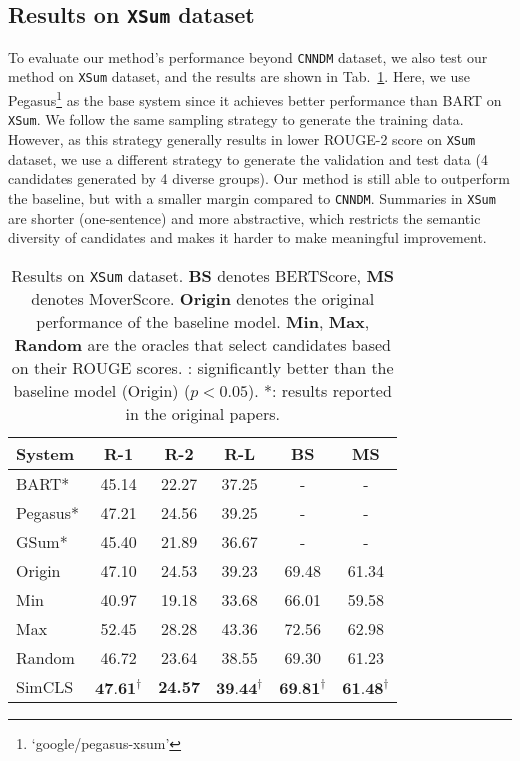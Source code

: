 \documentclass[11pt,a4paper]{article}
\begin{document}
\subsection{Results on \texttt{XSum} dataset}

To evaluate our method's performance beyond \texttt{CNNDM} dataset, we also test our method on \texttt{XSum} dataset, and the results are shown in Tab.~\ref{tab:other}.
Here, we use Pegasus\footnote{`google/pegasus-xsum'} as the base system since it achieves better performance than BART on \texttt{XSum}.
We follow the same sampling strategy to generate the training data.
However, as this strategy generally results in lower ROUGE-2 score on \texttt{XSum} dataset, we use a different strategy to generate the validation and test data (4 candidates generated by 4 diverse groups).
Our method is still able to outperform the baseline, but with a smaller margin compared to \texttt{CNNDM}.
Summaries in \texttt{XSum} are shorter (one-sentence) and more abstractive, which restricts the semantic diversity of candidates and makes it harder to make meaningful improvement.
\begin{table}[t!]
\small
\centering
\addtolength{\tabcolsep}{-1pt} 
\begin{tabular}{lccccc}
\toprule
\textbf{System} & \textbf{R-1} & \textbf{R-2} & \textbf{R-L}  & \textbf{BS} & \textbf{MS}\\
 \midrule
 BART* & 45.14 & 22.27 & 37.25 & - & -\\
 Pegasus* & 47.21 & 24.56 & 39.25 & - & - \\
 GSum* & 45.40 & 21.89 & 36.67 & - & -\\
\midrule
 Origin & 47.10 & 24.53 & 39.23 & 69.48 & 61.34\\
 Min & 40.97 & 19.18 & 33.68 & 66.01 & 59.58 \\
 Max & 52.45 & 28.28 & 43.36 & 72.56 & 62.98\\
 Random & 46.72 & 23.64 & 38.55 & 69.30 & 61.23\\
\midrule
 SimCLS & $\textbf{47.61}^\dag$ & \textbf{24.57} & $\textbf{39.44}^\dag$ & $\textbf{69.81}^\dag$ & $\textbf{61.48}^\dag$\\
\bottomrule
\end{tabular}
\addtolength{\tabcolsep}{+1pt} 
\vspace{-2mm}
\caption{\label{tab:other} Results on \texttt{XSum} dataset. 
\textbf{BS} denotes BERTScore, \textbf{MS} denotes MoverScore. 
\textbf{Origin} denotes the original performance of the baseline model.
\textbf{Min}, \textbf{Max}, \textbf{Random} are the oracles that select candidates based on their ROUGE scores.
\dag: significantly better than the baseline model (Origin) ($p < 0.05$). 
*: results reported in the original papers.}
\end{table}
\end{document}
